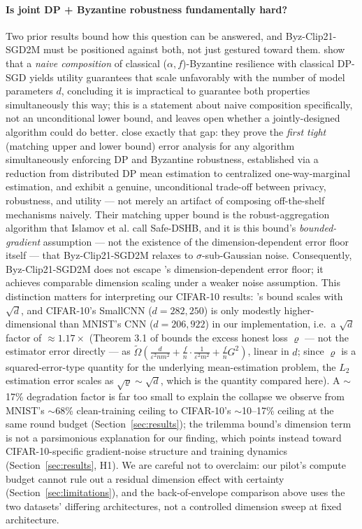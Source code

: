 \documentclass{article}
\begin{document}
\paragraph{Is joint DP + Byzantine robustness fundamentally hard?} Two prior
results bound how this question can be answered, and Byz-Clip21-SGD2M must be
positioned against both, not just gestured toward them.
\citet{guerraoui2021differential} show that a \emph{naive composition} of
classical ($\alpha,f$)-Byzantine resilience with classical DP-SGD yields utility
guarantees that scale unfavorably with the number of model parameters $d$,
concluding it is impractical to guarantee both properties simultaneously this
way; this is a statement about naive composition specifically, not an
unconditional lower bound, and leaves open whether a jointly-designed algorithm
could do better. \citet{allouah2023trilemma} close exactly that gap: they prove
the \emph{first tight} (matching upper and lower bound) error analysis for any
algorithm simultaneously enforcing DP and Byzantine robustness, established via
a reduction from distributed DP mean estimation to centralized one-way-marginal
estimation, and exhibit a genuine, unconditional trade-off between privacy,
robustness, and utility --- not merely an artifact of composing off-the-shelf
mechanisms naively. Their matching upper bound is the robust-aggregation
algorithm that Islamov et al. call Safe-DSHB, and it is this bound's
\emph{bounded-gradient} assumption --- not the existence of the dimension-dependent
error floor itself --- that Byz-Clip21-SGD2M relaxes to $\sigma$-sub-Gaussian
noise. Consequently, Byz-Clip21-SGD2M does not escape
\citeauthor{allouah2023trilemma}'s dimension-dependent error floor; it achieves
comparable dimension scaling under a weaker noise assumption. This distinction
matters for interpreting our CIFAR-10 results: \citeauthor{allouah2023trilemma}'s
bound scales with $\sqrt{d}$, and CIFAR-10's SmallCNN
($d=282{,}250$) is only modestly higher-dimensional than MNIST's CNN
($d=206{,}922$) in our implementation, i.e.\ a $\sqrt{d}$ factor of
$\approx1.17\times$ (Theorem 3.1 of \citeauthor{allouah2023trilemma} bounds
the excess honest loss $\varrho$ --- not the estimator error directly --- as
$\tilde\Omega\!\left(\frac{d}{\varepsilon^2 nm^2} + \frac{f}{n}\cdot\frac{1}{\varepsilon^2m^2} + \frac{f}{n}G^2\right)$,
linear in $d$; since $\varrho$ is a squared-error-type quantity for the
underlying mean-estimation problem, the $L_2$ estimation error scales as
$\sqrt{\varrho} \sim \sqrt{d}$, which is the quantity compared here). A
$\sim$17\% degradation factor is far too
small to explain the collapse we observe from MNIST's $\sim$68\% clean-training
ceiling to CIFAR-10's $\sim$10--17\% ceiling at the same round budget
(Section~\ref{sec:results}); the trilemma bound's dimension term is not a
parsimonious explanation for our finding, which points instead toward
CIFAR-10-specific gradient-noise structure and training dynamics
(Section~\ref{sec:results}, H1). We are careful not to overclaim: our pilot's
compute budget cannot rule out a residual dimension effect with certainty
(Section~\ref{sec:limitations}), and the back-of-envelope comparison above uses
the two datasets' differing architectures, not a controlled dimension sweep at
fixed architecture.
\end{document}
